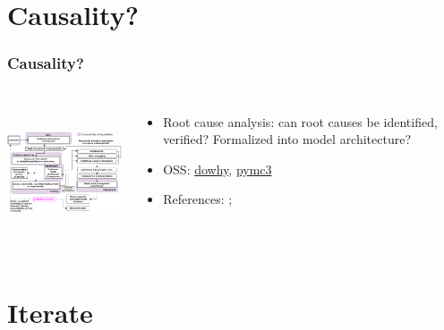 \documentclass[11pt,
               aspectratio=169,
               hyperref={colorlinks}
               ]{beamer}
\begin{document}
	\section{Causality?}

		\begin{frame}
		
			\frametitle{Causality?}	
			
			\begin{columns}
	
				\centering
				\includegraphics[height=120pt]{../img/cause.png}
				
				\begin{itemize}
					\item Root cause analysis: can root causes be identified, verified? Formalized into model architecture? 
					\item OSS: \href{https://github.com/microsoft/dowhy}{dowhy}, \href{https://docs.pymc.io/}{pymc3}
					\item References: ; 
				\end{itemize}
				
			\end{columns}
			
		\end{frame}

	\section{Iterate}
\end{document}
